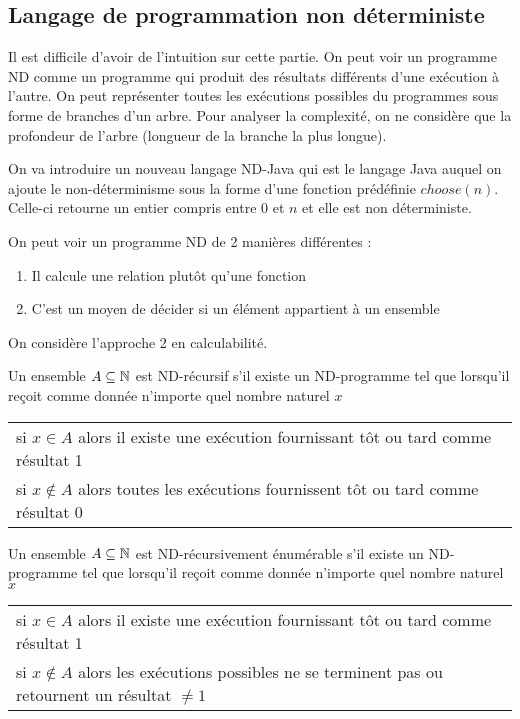 
\subsection{Langage de programmation non déterministe}
\label{ssub:langague_de_programmation_non_d_terministe}

\begin{myrem}
	Il est difficile d'avoir de l'intuition sur cette partie. On peut
	voir un programme ND comme un programme qui produit des résultats
	différents d'une exécution à l'autre. On peut représenter toutes
	les exécutions possibles du programmes sous forme de branches d'un
	arbre. Pour analyser la complexité, on ne
	considère que la profondeur de l'arbre (longueur de la branche
	la plus longue).
\end{myrem}

On va introduire un nouveau langage ND-Java qui est le langage Java
auquel on ajoute le non-déterminisme sous la forme d'une fonction
prédéfinie $choose(n)$. Celle-ci retourne un entier compris entre $0$ et $n$ et elle
est non déterministe.

On peut voir un programme ND de 2 manières différentes :
\begin{enumerate}
	\item Il calcule une relation plutôt qu'une fonction
	\item C'est un moyen de décider si un élément appartient à un
		ensemble
\end{enumerate}
On considère l'approche 2 en calculabilité.

\begin{mydef}[ND-récursif] \label{def:ND-rec}
	Un ensemble $A \subseteq \mathbb{N}$ est ND-récursif s’il existe un
	ND-programme tel que lorsqu'il reçoit comme donnée n'importe quel nombre
	naturel $x$ \\
	\begin{tabular}{l}
	si $x \in A$ alors il existe une exécution fournissant tôt ou tard
	comme résultat 1 \\
	si $x \notin A$ alors toutes les exécutions fournissent tôt ou tard
	comme résultat 0 \\
	\end{tabular}
\end{mydef}

\begin{mydef} \label{def:ND-recenum}
	Un ensemble $A \subseteq \mathbb{N}$ est ND-récursivement énumérable s’il existe un
	ND-programme tel que lorsqu'il reçoit comme donnée n'importe quel nombre
	naturel $x$ \\
	\begin{tabular}{l}
	si $x \in A$ alors il existe une exécution fournissant tôt ou tard
	comme résultat 1 \\
	si $x \notin A$ alors les exécutions possibles ne se terminent pas ou
	retournent un résultat $\neq 1$ \\
	\end{tabular}
\end{mydef}

